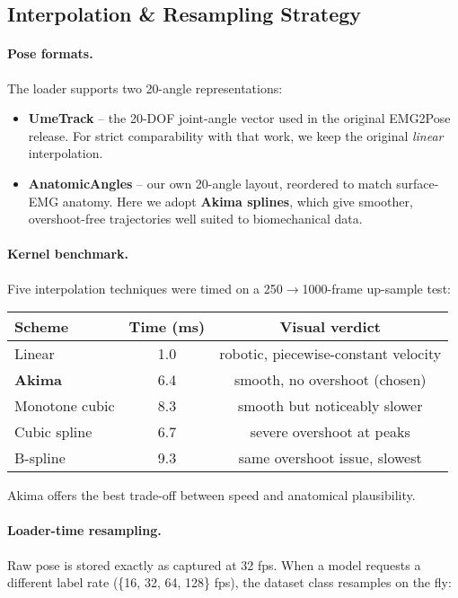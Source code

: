 \subsection{Interpolation \& Resampling Strategy}

\paragraph{Pose formats.}
The loader supports two 20-angle representations:

\begin{itemize}
  \item \textbf{UmeTrack} -- the 20-DOF joint-angle vector used in the original
        EMG2Pose release. For strict comparability with that work, we keep the
        original \emph{linear} interpolation.
  \item \textbf{AnatomicAngles} -- our own 20-angle layout, reordered to match
        surface-EMG anatomy. Here we adopt \textbf{Akima splines}, which give
        smoother, overshoot-free trajectories well suited to biomechanical
        data.
\end{itemize}

\paragraph{Kernel benchmark.}
Five interpolation techniques were timed on a 250$\to$1000-frame up-sample test:

\begin{center}\small
\begin{tabular}{@{}lcc@{}}
\toprule
Scheme            & Time (ms) & Visual verdict \\ \midrule
Linear            & 1.0  & robotic, piecewise-constant velocity \\
\textbf{Akima}    & 6.4  & smooth, no overshoot (chosen) \\
Monotone cubic    & 8.3  & smooth but noticeably slower \\
Cubic spline      & 6.7  & severe overshoot at peaks \\
B-spline          & 9.3  & same overshoot issue, slowest \\ \bottomrule
\end{tabular}
\end{center}

Akima offers the best trade-off between speed and anatomical plausibility.

\paragraph{Loader-time resampling.}
Raw pose is stored exactly as captured at 32 fps.
When a model requests a different label rate (\{16, 32, 64, 128\} fps),
the dataset class resamples on the fly:

